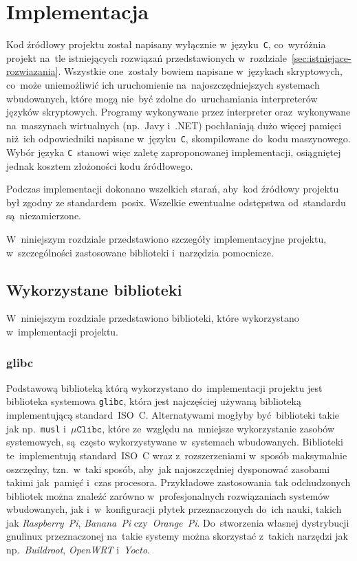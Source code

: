 \documentclass[thesis]{subfiles}
\begin{document}
\chapter{Implementacja}
\label{chapter:implementacja}

Kod źródłowy projektu został napisany wyłącznie w~języku~\texttt{C}, co~wyróżnia projekt na~tle istniejących rozwiązań przedstawionych w~rozdziale~\ref{sec:istniejace-rozwiazania}. Wszystkie one~zostały bowiem napisane w~językach skryptowych, co~może uniemożliwić ich uruchomienie na~najoszczędniejszych systemach wbudowanych, które mogą nie~być zdolne do~uruchamiania interpreterów języków skryptowych. Programy wykonywane przez interpreter oraz~wykonywane na~maszynach wirtualnych (np.~Javy i~.NET) pochłaniają dużo więcej pamięci niż~ich odpowiedniki napisane w~języku~\texttt{C}, skompilowane do~kodu maszynowego. Wybór języka \texttt{C}~stanowi więc zaletę zaproponowanej implementacji, osiągniętej jednak kosztem złożoności kodu źródłowego.

Podczas implementacji dokonano wszelkich starań, aby~kod źródłowy projektu był zgodny ze standardem~\gls{posix}. Wszelkie ewentualne odstępstwa od~standardu są~niezamierzone.

W~niniejszym rozdziale przedstawiono szczegóły implementacyjne projektu, w~szczególności zastosowane biblioteki i~narzędzia pomocnicze.


\section{Wykorzystane biblioteki}

W~niniejszym rozdziale przedstawiono biblioteki, które wykorzystano w~implementacji projektu.


\subsection{glibc}

Podstawową biblioteką którą wykorzystano do~implementacji projektu jest biblioteka systemowa \texttt{glibc}, która jest najczęściej używaną biblioteką implementującą standard~ISO~C. Alternatywami mogłyby być~biblioteki takie jak np.~\texttt{musl} i~$\mu\texttt{Clibc}$, które ze~względu na~mniejsze wykorzystanie zasobów systemowych, są~często wykorzystywane w~systemach wbudowanych. Biblioteki te~implementują standard~ISO~C wraz z~rozszerzeniami w~sposób maksymalnie oszczędny, tzn.~w~taki sposób, aby~jak najoszczędniej dysponować zasobami takimi jak~pamięć i~czas procesora. Przykładowe zastosowania tak odchudzonych bibliotek można znaleźć zarówno w~profesjonalnych rozwiązaniach systemów wbudowanych, jak i~w~konfiguracji płytek przeznaczonych do~ich nauki, takich jak \emph{Raspberry~Pi}, \emph{Banana~Pi} czy~\emph{Orange~Pi}. Do~stworzenia własnej dystrybucji \gls{gnulinux} przeznaczonej na~takie systemy można skorzystać z~takich narzędzi jak np.~\emph{Buildroot}, \emph{OpenWRT} i~\emph{Yocto}.
\end{document}
